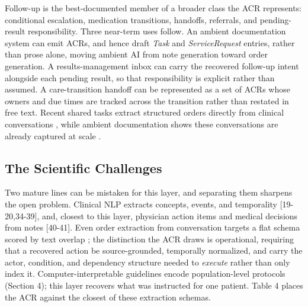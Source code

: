 Follow-up is the best-documented member of a broader class the ACR represents: conditional escalation, medication transitions, handoffs, referrals, and pending-result responsibility. Three near-term uses follow. An ambient documentation system can emit ACRs, and hence draft \emph{Task} and \emph{ServiceRequest} entries, rather than prose alone, moving ambient AI from note generation toward order generation. A results-management inbox can carry the recovered follow-up intent alongside each pending result, so that responsibility is explicit rather than assumed. A care-transition handoff can be represented as a set of ACRs whose owners and due times are tracked across the transition rather than restated in free text. Recent shared tasks extract structured orders directly from clinical conversations \cite{ref32}, while ambient documentation shows these conversations are already captured at scale \cite{ref33}.

\subsection{The Scientific Challenges}\label{the-scientific-challenges}

Two mature lines can be mistaken for this layer, and separating them sharpens the open problem. Clinical NLP extracts concepts, events, and temporality {[}19-20,34-39{]}, and, closest to this layer, physician action items and medical decisions from notes {[}40-41{]}. Even order extraction from conversation targets a flat schema scored by text overlap \cite{ref32}; the distinction the ACR draws is operational, requiring that a recovered action be source-grounded, temporally normalized, and carry the actor, condition, and dependency structure needed to \emph{execute} rather than only index it. Computer-interpretable guidelines encode population-level protocols (Section 4); this layer recovers what was instructed for one patient. Table 4 places the ACR against the closest of these extraction schemas.


